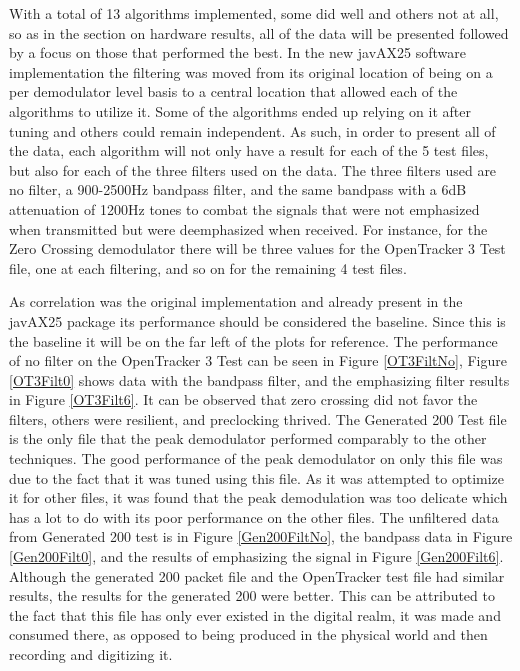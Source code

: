 With a total of 13 algorithms implemented, some did well and others not at all, so as in the section on hardware results, all of the data will be presented followed by a focus on those that performed the best. In the new javAX25 software implementation the filtering was moved from its original location of being on a per demodulator level basis to a central location that allowed each of the algorithms to utilize it. Some of the algorithms ended up relying on it after tuning and others could remain independent. As such, in order to present all of the data, each algorithm will not only have a result for each of the 5 test files, but also for each of the three filters used on the data. The three filters used are no filter, a 900-2500Hz bandpass filter, and the same bandpass with a 6dB attenuation of 1200Hz tones to combat the signals that were not emphasized when transmitted but were deemphasized when received. For instance, for the Zero Crossing demodulator there will be three values for the OpenTracker 3 Test file, one at each filtering, and so on for the remaining 4 test files.

As correlation was the original implementation and already present in the javAX25 package its performance should be considered the baseline. Since this is the baseline it will be on the far left of the plots for reference. The performance of no filter on the OpenTracker 3 Test can be seen in Figure \ref{OT3FiltNo}, Figure \ref{OT3Filt0} shows data with the bandpass filter, and the emphasizing filter results in Figure \ref{OT3Filt6}. It can be observed that zero crossing did not favor the filters, others were resilient, and preclocking thrived. The Generated 200 Test file is the only file that the peak demodulator performed comparably to the other techniques. The good performance of the peak demodulator on only this file was due to the fact that it was tuned using this file. As it was attempted to optimize it for other files, it was found that the peak demodulation was too delicate which has a lot to do with its poor performance on the other files. The unfiltered data from Generated 200 test is in Figure \ref{Gen200FiltNo}, the bandpass data in Figure \ref{Gen200Filt0}, and the results of emphasizing the signal in Figure \ref{Gen200Filt6}. Although the generated 200 packet file and the OpenTracker test file had similar results, the results for the generated 200 were better. This can be attributed to the fact that this file has only ever existed in the digital realm, it was made and consumed there, as opposed to being produced in the physical world and then recording and digitizing it.

